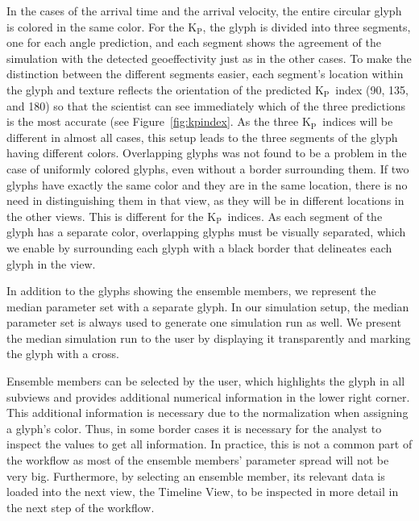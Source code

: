 \documentclass[journal]{vgtc}                %
\newcommand{\kpIndex}{$\textrm{K}_\textrm{P}$}
\begin{document}
In the cases of the arrival time and the arrival velocity, the entire circular glyph is colored in the same color. For the \kpIndex , the glyph is divided into three segments, one for each angle prediction, and each segment shows the agreement of the simulation with the detected geoeffectivity just as in the other cases. To make the distinction between the different segments easier, each segment's location within the glyph and texture reflects the orientation of the predicted \kpIndex\ index (90\degree , 135\degree , and 180\degree ) so that the scientist can see immediately which of the three predictions is the most accurate (see Figure~\ref{fig:kpindex}. As the three \kpIndex\ indices will be different in almost all cases, this setup leads to the three segments of the glyph having different colors. Overlapping glyphs was not found to be a problem in the case of uniformly colored glyphs, even without a border surrounding them. If two glyphs have exactly the same color and they are in the same location, there is no need in distinguishing them in that view, as they will be in different locations in the other views. This is different for the \kpIndex\ indices. As each segment of the glyph has a separate color, overlapping glyphs must be visually separated, which we enable by surrounding each glyph with a black border that delineates each glyph in the view.

In addition to the glyphs showing the ensemble members, we represent the median parameter set with a separate glyph. In our simulation setup, the median parameter set is always used to generate one simulation run as well. We present the median simulation run to the user by displaying it transparently and marking the glyph with a cross.

Ensemble members can be selected by the user, which highlights the glyph in all subviews and provides additional numerical information in the lower right corner. This additional information is necessary due to the normalization when assigning a glyph's color. Thus, in some border cases it is necessary for the analyst to inspect the values to get all information. In practice, this is not a common part of the workflow as most of the ensemble members' parameter spread will not be very big. Furthermore, by selecting an ensemble member, its relevant data is loaded into the next view, the Timeline View, to be inspected in more detail in the next step of the workflow.
\end{document}
